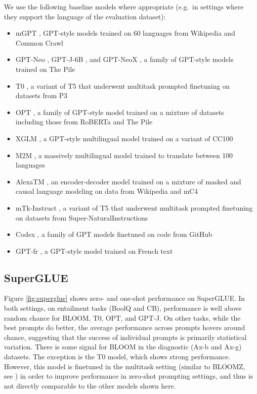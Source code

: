 \documentclass[twoside,11pt]{article}
\begin{document}
We use the following baseline models where appropriate (e.g.\ in settings where they support the language of the evaluation dataset): 
\begin{itemize}
    \item mGPT \citep{shliazhko2022mgpt}, GPT-style models trained on 60 languages from Wikipedia and Common Crawl
    \item GPT-Neo \citep{black2021gpt}, GPT-J-6B \citep{wang2021gpt}, and GPT-NeoX \citep{black2022gpt}, a family of GPT-style models trained on The Pile \citep{gao2020pile}
    \item T0 \citep{sanh2022multitask}, a variant of T5 \citep{raffel2020exploring} that underwent multitask prompted finetuning on datasets from P3 \citep{bach2022promptsource}
    \item OPT \citep{zhang2022opt}, a family of GPT-style model trained on a mixture of datasets including those from RoBERTa \cite{liu2019roberta} and The Pile \citep{gao2020pile}
    \item XGLM \citep{lin2021xglm}, a GPT-style multilingual model trained on a variant of CC100 \citep{conneau2020unsupervised}
    \item M2M \citep{fan-etal-2021-beyond}, a massively multilingual model trained to translate between 100 languages
    \item AlexaTM \citep{soltan-etal-2022-alexatm}, an encoder-decoder model trained on a mixture of masked and causal language modeling on data from Wikipedia and mC4 \citep{xue2021mt5}
    \item mTk-Instruct \citep{wang2022benchmarking}, a variant of T5 that underwent multitask prompted finetuning on datasets from Super-NaturalInstructions
    \item Codex \citep{chen2021evaluating}, a family of GPT models finetuned on code from GitHub
    \item GPT-fr \citep{simoulin:hal-03265900}, a GPT-style model trained on French text
\end{itemize}

\subsection{SuperGLUE}
\label{sec:eval:superglue}

Figure \ref{fig:superglue} shows zero- and one-shot performance on SuperGLUE. In both settings, on entailment tasks (BoolQ and CB), performance is well above random chance for BLOOM, T0, OPT, and GPT-J. On other tasks, while the best prompts do better, the average performance across prompts hovers around chance, suggesting that the success of individual prompts is primarily statistical variation. There is some signal for BLOOM in the diagnostic (Ax-b and Ax-g) datasets. The exception is the T0 model, which shows strong performance. However, this model is finetuned in the multitask setting (similar to BLOOMZ, see ) in order to improve performance in zero-shot prompting settings, and thus is not directly comparable to the other models shown here. 
\end{document}
